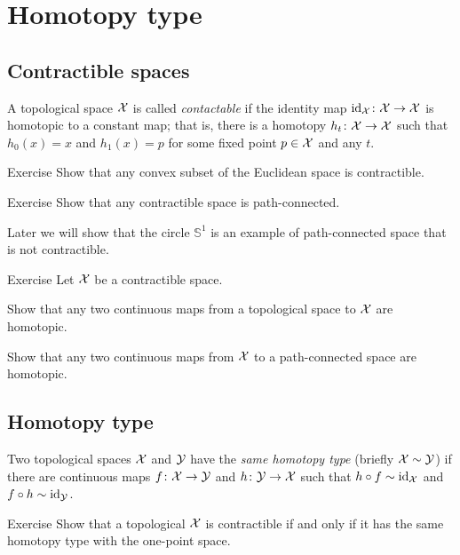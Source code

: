 \chapter{Homotopy type}

\section{Contractible spaces}

A topological space $\mathcal{X}$ is called \emph{contactable} if the identity map $\id_\c{X}\:\c{X}\z\to \c{X}$ is homotopic to a constant map;
that is, there is a homotopy $h_t\colon\mathcal{X}\to\mathcal{X}$ such that $h_0(x)=x$ and $h_1(x)=p$ for some fixed point $p\in\mathcal{X}$ and any $t$.

\begin{thm}{Exercise}
Show that any convex subset of the Euclidean space is contractible.
\end{thm}


\begin{thm}{Exercise}
Show that any contractible space is path-connected.
\end{thm}

Later we will show that the circle $\mathbb{S}^1$ is an example of path-connected space that is not contractible.

\begin{thm}{Exercise}
Let $\mathcal{X}$ be a contractible space.

\begin{subthm}{}
Show that any two continuous maps from a topological space to $\mathcal{X}$ are homotopic.
\end{subthm}

\begin{subthm}{}
Show that any two continuous maps from $\mathcal{X}$ to a path-connected space are homotopic.
\end{subthm}

\end{thm}

\section{Homotopy type}

Two topological spaces $\mathcal{X}$ and $\mathcal{Y}$ have the \emph{same homotopy type} (briefly $\mathcal{X}\sim\mathcal{Y}$) if there are continuous maps
$f\colon \mathcal{X}\to \mathcal{Y}$ and $h\colon\mathcal{Y}\to \mathcal{X}$ such that $h\circ f\sim \mathrm{id}_\mathcal{X}$ and $f\circ h\sim \mathrm{id}_\mathcal{Y}$.

\begin{thm}{Exercise}
Show that a topological $\mathcal{X}$ is contractible if and only if it has the same homotopy type with the one-point space.
\end{thm}

